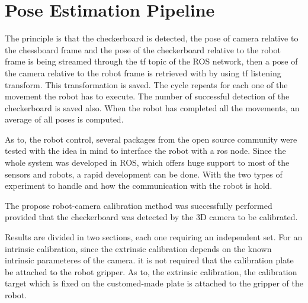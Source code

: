 		











\section{Pose Estimation Pipeline}
\iffalse
 The principle is that the checkerboard is detected, the pose of camera relative to the chessboard frame and the pose of the checkerboard relative to the robot frame is being streamed through the tf topic of  the ROS network, then a pose of the camera relative to the robot frame is retrieved with by using tf listening transform. This transformation is saved. The cycle repeats for each one of the movement the robot has to execute. The number of successful detection of the checkerboard is saved also. When the robot has completed all the movements, an average of all poses is computed. 

As to, the robot control, several packages from the open source community were tested with the idea in mind to interface the robot with a ros node.  Since the whole system was developed in ROS, which offers huge support to most of the sensors and robots, a rapid development can be done. 
With the two types of experiment to handle and how the communication with the robot is hold. 



The propose robot-camera calibration method was successfully performed provided that the checkerboard was detected by the 3D camera to be calibrated.


 Results are divided in two sections, each one requiring an independent set. For an intrinsic calibration, since the extrinsic calibration depends on the known intrinsic parameteres of the camera.  it is not required that the calibration plate be attached to the robot gripper. As to, the extrinsic calibration, the calibration target which is fixed on the customed-made plate is attached to the gripper of the robot.

